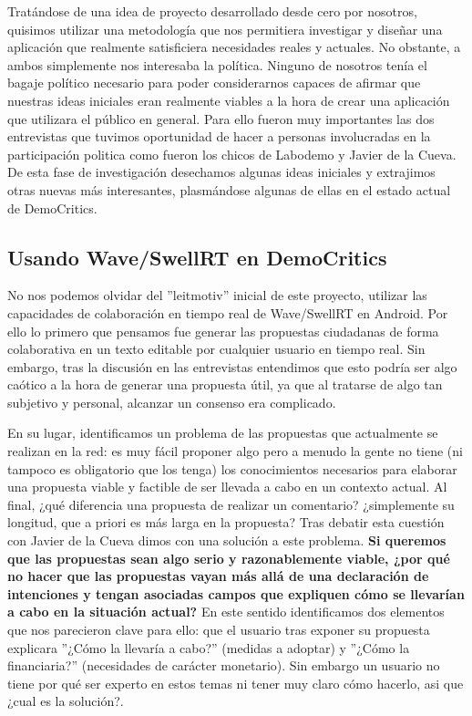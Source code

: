 Tratándose de una idea de proyecto desarrollado desde cero por nosotros, quisimos utilizar una metodología que nos permitiera investigar y diseñar una aplicación que realmente satisficiera necesidades reales y actuales. No obstante, a ambos simplemente nos interesaba la política. Ninguno de nosotros tenía el bagaje político necesario para poder considerarnos capaces de afirmar que nuestras ideas iniciales eran realmente viables a la hora de crear una aplicación que utilizara el público en general. Para ello fueron muy importantes las dos entrevistas que tuvimos oportunidad de hacer a personas involucradas en la participación politica como fueron los chicos de Labodemo y Javier de la Cueva. De esta fase de investigación desechamos algunas ideas iniciales y extrajimos otras nuevas más interesantes, plasmándose algunas de ellas en el estado actual de DemoCritics. 

\subsection{Usando Wave/SwellRT en DemoCritics}

No nos podemos olvidar del ''leitmotiv'' inicial de este proyecto, utilizar las capacidades de colaboración en tiempo real de Wave/SwellRT en Android. Por ello lo primero que pensamos fue generar las propuestas ciudadanas de forma colaborativa en un texto editable por cualquier usuario en tiempo real. Sin embargo, tras la discusión en las entrevistas entendimos que esto podría ser algo caótico a la hora de generar una propuesta útil, ya que al tratarse de algo tan subjetivo y personal, alcanzar un consenso era complicado. 

En su lugar, identificamos un problema de las propuestas que actualmente se realizan en la red: es muy fácil proponer algo pero a menudo la gente no tiene (ni tampoco es obligatorio que los tenga) los conocimientos necesarios para elaborar una propuesta viable y factible de ser llevada a cabo en un contexto actual. Al final, ¿qué diferencia una propuesta de realizar un comentario? ¿simplemente su longitud, que a priori es más larga en la propuesta? Tras debatir esta cuestión con Javier de la Cueva dimos con una solución a este problema. \textbf{Si queremos que las propuestas sean algo serio y razonablemente viable, ¿por qué no hacer que las propuestas vayan más allá de una declaración de intenciones y tengan asociadas campos que expliquen cómo se llevarían a cabo en la situación actual?} En este sentido identificamos dos elementos que nos parecieron clave para ello: que el usuario tras exponer su propuesta explicara ''¿Cómo la llevaría a cabo?'' (medidas a adoptar) y ''¿Cómo la financiaria?'' (necesidades de carácter monetario). Sin embargo un usuario no tiene por qué ser experto en estos temas ni tener muy claro cómo hacerlo, asi que ¿cual es la solución?.

